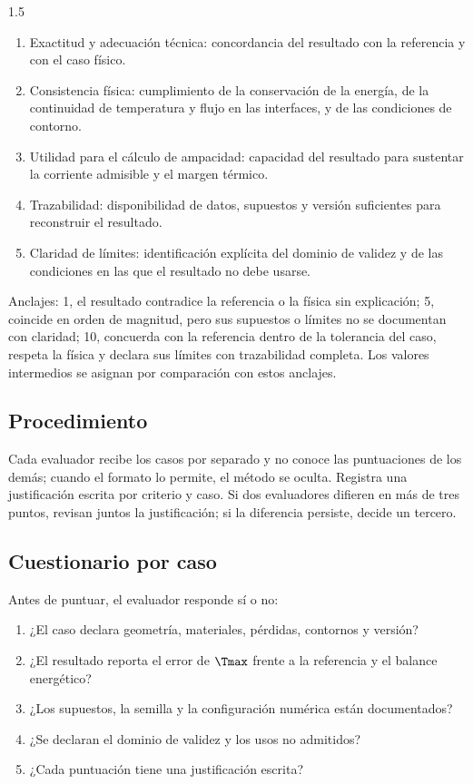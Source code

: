 \begin{spacing}{1.5}
\begin{enumerate}
  \item Exactitud y adecuación técnica: concordancia del resultado con la referencia y con el caso físico.
  \item Consistencia física: cumplimiento de la conservación de la energía, de la continuidad de temperatura y flujo en las interfaces, y de las condiciones de contorno.
  \item Utilidad para el cálculo de ampacidad: capacidad del resultado para sustentar la corriente admisible y el margen térmico.
  \item Trazabilidad: disponibilidad de datos, supuestos y versión suficientes para reconstruir el resultado.
  \item Claridad de límites: identificación explícita del dominio de validez y de las condiciones en las que el resultado no debe usarse.
\end{enumerate}

Anclajes: 1, el resultado contradice la referencia o la física sin explicación; 5, coincide en orden de magnitud, pero sus supuestos o límites no se documentan con claridad; 10, concuerda con la referencia dentro de la tolerancia del caso, respeta la física y declara sus límites con trazabilidad completa. Los valores intermedios se asignan por comparación con estos anclajes.

\subsection{Procedimiento}

Cada evaluador recibe los casos por separado y no conoce las puntuaciones de los demás; cuando el formato lo permite, el método se oculta. Registra una justificación escrita por criterio y caso. Si dos evaluadores difieren en más de tres puntos, revisan juntos la justificación; si la diferencia persiste, decide un tercero.

\subsection{Cuestionario por caso}

Antes de puntuar, el evaluador responde sí o no:

\begin{enumerate}
  \item ¿El caso declara geometría, materiales, pérdidas, contornos y versión?
  \item ¿El resultado reporta el error de $\Tmax$ frente a la referencia y el balance energético?
  \item ¿Los supuestos, la semilla y la configuración numérica están documentados?
  \item ¿Se declaran el dominio de validez y los usos no admitidos?
  \item ¿Cada puntuación tiene una justificación escrita?
\end{enumerate}


\end{spacing}
